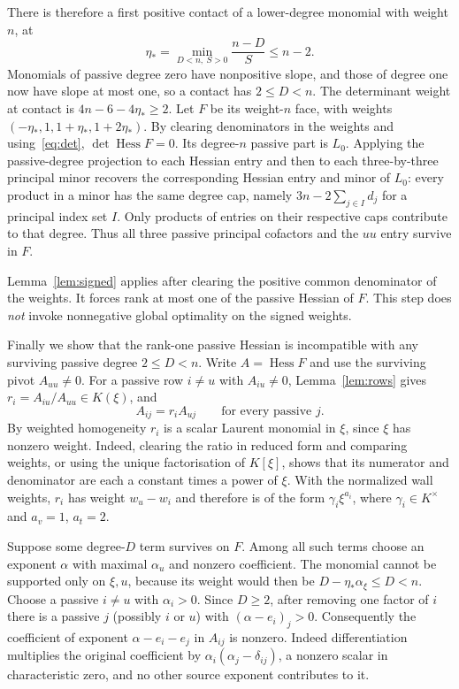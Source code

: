 \documentclass[11pt,a4paper]{article}
\newcommand{\Hess}{\operatorname{Hess}}
\begin{document}
There is therefore a first positive contact of a lower-degree monomial with weight $n$, at
\[
 \eta_*=\min_{D<n,\ S>0}\frac{n-D}{S}\le n-2 .
\]
Monomials of passive degree zero have nonpositive slope, and those of degree one now have slope at most one, so a contact has $2\le D<n$. The determinant weight at contact is $4n-6-4\eta_*\ge2$. Let $F$ be its weight-$n$ face, with weights $(-\eta_*,1,1+\eta_*,1+2\eta_*)$. By clearing denominators in the weights and using~\eqref{eq:det}, $\det\Hess F=0$. Its degree-$n$ passive part is $L_0$. Applying the passive-degree projection to each Hessian entry and then to each three-by-three principal minor recovers the corresponding Hessian entry and minor of $L_0$: every product in a minor has the same degree cap, namely $3n-2\sum_{j\in I}d_j$ for a principal index set $I$. Only products of entries on their respective caps contribute to that degree. Thus all three passive principal cofactors and the $uu$ entry survive in $F$.

Lemma~\ref{lem:signed} applies after clearing the positive common denominator of the weights. It forces rank at most one of the passive Hessian of $F$. This step does \emph{not} invoke nonnegative global optimality on the signed weights.

Finally we show that the rank-one passive Hessian is incompatible with any surviving passive degree $2\le D<n$. Write $A=\Hess F$ and use the surviving pivot $A_{uu}\ne0$. For a passive row $i\ne u$ with $A_{iu}\ne0$, Lemma~\ref{lem:rows} gives $r_i=A_{iu}/A_{uu}\in K(\xi)$, and
\[
 A_{ij}=r_i A_{uj}\qquad\text{for every passive }j.
\]
By weighted homogeneity $r_i$ is a scalar Laurent monomial in $\xi$, since $\xi$ has nonzero weight. Indeed, clearing the ratio in reduced form and comparing weights, or using the unique factorisation of $K[\xi]$, shows that its numerator and denominator are each a constant times a power of $\xi$. With the normalized wall weights, $r_i$ has weight $w_u-w_i$ and therefore is of the form $\gamma_i\xi^{a_i}$, where $\gamma_i\in K^\times$ and $a_v=1$, $a_t=2$.

Suppose some degree-$D$ term survives on $F$. Among all such terms choose an exponent $\alpha$ with maximal $\alpha_u$ and nonzero coefficient. The monomial cannot be supported only on $\xi,u$, because its weight would then be $D-\eta_*\alpha_\xi\le D<n$. Choose a passive $i\ne u$ with $\alpha_i>0$. Since $D\ge2$, after removing one factor of $i$ there is a passive $j$ (possibly $i$ or $u$) with $(\alpha-e_i)_j>0$. Consequently the coefficient of exponent $\alpha-e_i-e_j$ in $A_{ij}$ is nonzero. Indeed differentiation multiplies the original coefficient by $\alpha_i(\alpha_j-\delta_{ij})$, a nonzero scalar in characteristic zero, and no other source exponent contributes to it.
\end{document}
